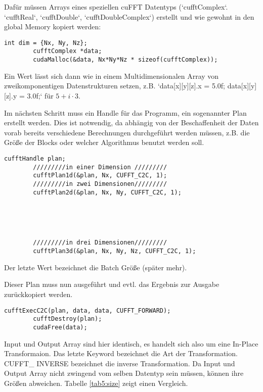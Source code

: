 		Dafür müssen Arrays eines speziellen cuFFT Datentyps (\li`cufftComplex`. \li`cufftReal`, \li`cufftDouble`, \li`cufftDoubleComplex`) erstellt und wie gewohnt in den \gls{global Memory} kopiert werden:
		\begin{lstlisting}[caption=cuFFT: komplexer Datentyp]
		int dim = {Nx, Ny, Nz};
		cufftComplex *data;
		cudaMalloc(&data, Nx*Ny*Nz * sizeof(cufftComplex));
		\end{lstlisting}
		Ein Wert lässt sich dann wie in einem Multidimensionalen Array von zweikomponentigen Datenstrukturen setzen, z.B. \li`data[x][y][z].x = 5.0f; data[x][y][z].y = 3.0f;` für $5 + i\cdot 3$.
	
		Im nächsten Schritt muss ein \Gls{Handle} für das Programm, ein sogenannter Plan erstellt werden. Dies ist notwendig, da abhängig von der Beschaffenheit der Daten vorab bereits verschiedene Berechnungen durchgeführt werden müssen, z.B. die Größe der \Glspl{Block} oder welcher Algorithmus benutzt werden soll. 
		\begin{lstlisting}[caption=cuFFT: Pläne]
		cufftHandle plan;
		/////////in einer Dimension /////////
		cufftPlan1d(&plan, Nx, CUFFT_C2C, 1);	
		/////////in zwei Dimensionen/////////
		cufftPlan2d(&plan, Nx, Ny, CUFFT_C2C, 1);	
		
		
		
		
		
		/////////in drei Dimensionen/////////
		cufftPlan3d(&plan, Nx, Ny, Nz, CUFFT_C2C, 1);
		\end{lstlisting}
		Der letzte Wert bezeichnet die Batch Größe (später mehr).
	
		Dieser Plan muss nun ausgeführt und evtl. das Ergebnis zur Ausgabe zurückkopiert werden.
		\begin{lstlisting}[caption=cuFFT: Ausführen]
		cufftExecC2C(plan, data, data, CUFFT_FORWARD);
		cufftDestroy(plan);
		cudaFree(data);
		\end{lstlisting}
		Input und Output Array sind hier identisch, es handelt sich also um eine In-Place Transformaion. Das letzte Keyword bezeichnet die Art der Transformation. CUFFT\_ INVERSE bezeichnet die inverse Transformation. Da Input und Output Array nicht zwingend vom selben Datentyp sein müssen, können ihre Größen abweichen. Tabelle \ref{tab5:size} zeigt einen Vergleich.
		
